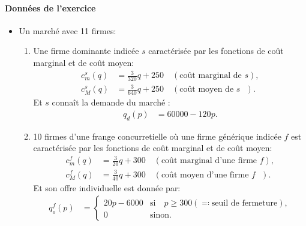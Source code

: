 \begin{frame}
  [allowframebreaks]{\insertsection}
  \framesubtitle{Données de l'exercice}
  \begin{itemize}
\item Un marché avec 11 firmes:
\begin{enumerate}[$\cdot$]
\item Une firme dominante indicée $s$ caractérisée par les fonctions de coût marginal et de coût moyen:
\begin{align}
c_m^s(q) &= \frac{3}{320}q + 250 \quad (\text{coût marginal de $s$}) \label{eq1},\\
c_M^s(q) &= \frac{3}{640}q + 250 \quad (\text{coût moyen de $s$ })\label{eq2}.
\end{align}
Et $s$ connaît la demande du marché :
\begin{align}
q_d(p) &= 60000 - 120p.\label{eq3}
\end{align}
\item 10 firmes d'une frange concurretielle où une firme générique indicée $f$ est caractérisée par les fonctions de coût marginal et de coût moyen:
\begin{align}
c_m^f (q)&= \frac{3}{20}q + 300 \quad (\text{coût marginal d'une firme $f$}) \label{eq4},\\
c_M^f(q) &= \frac{3}{40}q + 300 \quad (\text{coût moyen d'une firme  $f$ })\label{eq5}.
\end{align}
Et son offre individuelle est donnée par:
\begin{align}
q_o^f(p) &= \left\{
\begin{array}{ll}
20p-6000 & \text{si} \quad p\geq 300 (\eqqcolon \text{seuil de fermeture}), \\
0 & \text{sinon}.
\end{array}\right.
\label{eq6}
\end{align}
\end{enumerate}
\end{itemize}
\end{frame}

